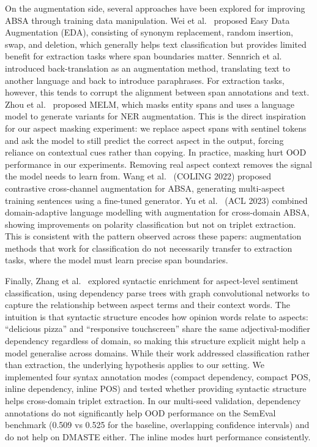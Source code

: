 \documentclass[12pt,a4paper]{report}
\begin{document}
On the augmentation side, several approaches have been explored for improving ABSA through training data manipulation. Wei et al.~\cite{wei2019eda} proposed Easy Data Augmentation (EDA), consisting of synonym replacement, random insertion, swap, and deletion, which generally helps text classification but provides limited benefit for extraction tasks where span boundaries matter. Sennrich et al.~\cite{sennrich2016backtranslation} introduced back-translation as an augmentation method, translating text to another language and back to introduce paraphrases. For extraction tasks, however, this tends to corrupt the alignment between span annotations and text. Zhou et al.~\cite{zhou2022melm} proposed MELM, which masks entity spans and uses a language model to generate variants for NER augmentation. This is the direct inspiration for our aspect masking experiment: we replace aspect spans with sentinel tokens and ask the model to still predict the correct aspect in the output, forcing reliance on contextual cues rather than copying. In practice, masking hurt OOD performance in our experiments. Removing real aspect context removes the signal the model needs to learn from. Wang et al.~\cite{wang2022contrastive_aug} (COLING 2022) proposed contrastive cross-channel augmentation for ABSA, generating multi-aspect training sentences using a fine-tuned generator. Yu et al.~\cite{yu2023crossdomain_aug} (ACL 2023) combined domain-adaptive language modelling with augmentation for cross-domain ABSA, showing improvements on polarity classification but not on triplet extraction. This is consistent with the pattern observed across these papers: augmentation methods that work for classification do not necessarily transfer to extraction tasks, where the model must learn precise span boundaries.

Finally, Zhang et al.~\cite{zhang2019aspect} explored syntactic enrichment for aspect-level sentiment classification, using dependency parse trees with graph convolutional networks to capture the relationship between aspect terms and their context words. The intuition is that syntactic structure encodes how opinion words relate to aspects: ``delicious pizza'' and ``responsive touchscreen'' share the same adjectival-modifier dependency regardless of domain, so making this structure explicit might help a model generalise across domains. While their work addressed classification rather than extraction, the underlying hypothesis applies to our setting. We implemented four syntax annotation modes (compact dependency, compact POS, inline dependency, inline POS) and tested whether providing syntactic structure helps cross-domain triplet extraction. In our multi-seed validation, dependency annotations do not significantly help OOD performance on the SemEval benchmark (0.509 vs 0.525 for the baseline, overlapping confidence intervals) and do not help on DMASTE either. The inline modes hurt performance consistently.
\end{document}

